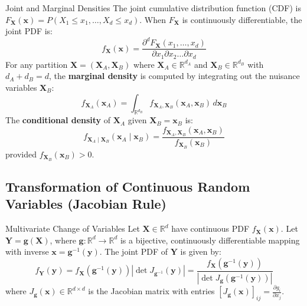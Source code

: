 \begin{definitionbox}{Joint and Marginal Densities}
The joint cumulative distribution function (CDF) is $F_{\mathbf{X}}(\mathbf{x}) = P(X_1 \le x_1, \dots, X_d \le x_d)$.
When $F_{\mathbf{X}}$ is continuously differentiable, the joint PDF is:
\begin{equation}
f_{\mathbf{X}}(\mathbf{x}) = \frac{\partial^d F_{\mathbf{X}}(x_1, \dots, x_d)}{\partial x_1 \partial x_2 \dots \partial x_d}
\end{equation}
For any partition $\mathbf{X} = (\mathbf{X}_A, \mathbf{X}_B)$ where $\mathbf{X}_A \in \mathbb{R}^{d_A}$ and $\mathbf{X}_B \in \mathbb{R}^{d_B}$ with $d_A + d_B = d$, the \textbf{marginal density} is computed by integrating out the nuisance variables $\mathbf{X}_B$:
\begin{equation}
f_{\mathbf{X}_A}(\mathbf{x}_A) = \int_{\mathbb{R}^{d_B}} f_{\mathbf{X}_A, \mathbf{X}_B}(\mathbf{x}_A, \mathbf{x}_B) \, d\mathbf{x}_B
\label{eq:marginalization}
\end{equation}
The \textbf{conditional density} of $\mathbf{X}_A$ given $\mathbf{X}_B = \mathbf{x}_B$ is:
\begin{equation}
f_{\mathbf{X}_A \mid \mathbf{X}_B}(\mathbf{x}_A \mid \mathbf{x}_B) = \frac{f_{\mathbf{X}_A, \mathbf{X}_B}(\mathbf{x}_A, \mathbf{x}_B)}{f_{\mathbf{X}_B}(\mathbf{x}_B)}
\end{equation}
provided $f_{\mathbf{X}_B}(\mathbf{x}_B) > 0$.
\end{definitionbox}

\subsection{Transformation of Continuous Random Variables (Jacobian Rule)}

\begin{theorembox}{Multivariate Change of Variables}
Let $\mathbf{X} \in \mathbb{R}^d$ have continuous PDF $f_{\mathbf{X}}(\mathbf{x})$. Let $\mathbf{Y} = \mathbf{g}(\mathbf{X})$, where $\mathbf{g}: \mathbb{R}^d \to \mathbb{R}^d$ is a bijective, continuously differentiable mapping with inverse $\mathbf{x} = \mathbf{g}^{-1}(\mathbf{y})$.
The joint PDF of $\mathbf{Y}$ is given by:
\begin{equation}
f_{\mathbf{Y}}(\mathbf{y}) = f_{\mathbf{X}}(\mathbf{g}^{-1}(\mathbf{y})) \left| \det J_{\mathbf{g}^{-1}}(\mathbf{y}) \right| = \frac{f_{\mathbf{X}}(\mathbf{g}^{-1}(\mathbf{y}))}{\left| \det J_{\mathbf{g}}(\mathbf{g}^{-1}(\mathbf{y})) \right|}
\label{eq:jacobian_transform}
\end{equation}
where $J_{\mathbf{g}}(\mathbf{x}) \in \mathbb{R}^{d \times d}$ is the Jacobian matrix with entries $[J_{\mathbf{g}}(\mathbf{x})]_{ij} = \frac{\partial g_i}{\partial x_j}$.
\end{theorembox}

